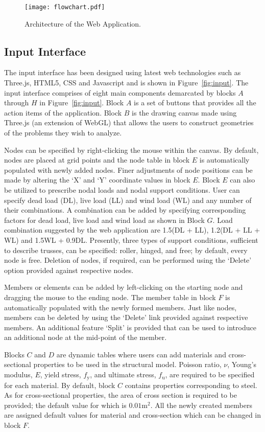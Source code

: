 \documentclass[preprint]{elsarticle}
\begin{document}
\begin{figure}[!h]
\centering
\texttt{[image: flowchart.pdf]}
\caption{Architecture of the Web Application.}
\label{fig:system}
\end{figure}


\subsection{Input Interface}
The input interface has been designed using latest web technologies such as
Three.js, HTML5, CSS and Javascript and is shown in Figure~\ref{fig:input}. The
input interface comprises of eight main components demarcated by blocks $A$
through $H$ in Figure~\ref{fig:input}. Block $A$ is a set of buttons that provides
all the action items of the application. Block $B$ is the drawing canvas made using
Three.js (an extension of WebGL) that allows the users to construct geometries
of the problems they wish to analyze.

Nodes can be specified by right-clicking the mouse within the canvas. By default, nodes are placed at grid points and the node table in block $E$ is automatically populated with newly added nodes. Finer adjustments of node positions can be made by altering the `X' and `Y' coordinate values in block $E$. Block $E$ can also be utilized to prescribe nodal loads and nodal support conditions. User can specify dead load (DL), live load (LL) and wind load (WL) and any number of their combinations. A combination can be added by specifying corresponding factors for dead load, live load and wind load as shown in Block $G$. Load combination suggested by the web application are 1.5(DL + LL), 1.2(DL + LL + WL) and 1.5WL + 0.9DL.  Presently, three types of support conditions, sufficient to describe trusses, can be specified: roller, hinged, and free; by default, every node is free. Deletion of nodes, if required, can be performed using the `Delete' option provided against respective nodes.

Members or elements can be added by left-clicking on the starting node and
dragging the mouse to the ending node. The member table in block $F$ is automatically
populated with the newly formed members. Just like nodes, members can be deleted
by using the `Delete' link provided against respective members. An additional
feature `Split' is provided that can be used to introduce an additional node at
the mid-point of the member.

Blocks $C$ and $D$ are dynamic tables where users can add materials and 
cross-sectional properties to be used in the structural model. Poisson ratio, $\nu$, Young's
modulus, $E$, yield stress, $f_\mathrm{y}$, and ultimate stress, $f_\mathrm{u}$,
are required to be specified for each material. By default, block $C$ contains
properties corresponding to steel. As for cross-sectional properties, the
area of cross section is required to be provided; the default value for which is
$0.01 \mathrm{m}^2$. All the newly created members are assigned default values
for material and cross-section which can be changed in block $F$.
\end{document}
